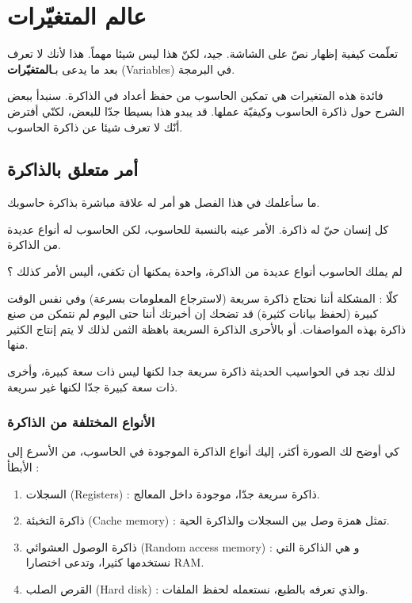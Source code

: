 \chapter{عالم المتغيّرات}

تعلّمت كيفية إظهار نصّ على الشاشة. جيد، لكنّ هذا ليس شيئا مهماً. هذا لأنك لا تعرف بعد ما يدعى بـ\textbf{المتغيّرات}
(\textenglish{Variables})
في البرمجة.

فائدة هذه المتغيرات هي تمكين الحاسوب من حفظ أعداد في الذاكرة. سنبدأ ببعض الشرح حول ذاكرة الحاسوب وكيفيّة عملها. قد يبدو هذا بسيطا جدّا للبعض، لكنّي أفترض أنّك لا تعرف شيئا عن ذاكرة الحاسوب.

\section{أمر متعلق بالذاكرة}
ما سأعلمك في هذا الفصل هو أمر له علاقة مباشرة بذاكرة حاسوبك.

كل إنسان حيّ له ذاكرة. الأمر عينه بالنسبة للحاسوب، لكن الحاسوب له أنواع عديدة من الذاكرة.

\begin{question}
  لم يملك الحاسوب أنواع عديدة من الذاكرة، واحدة يمكنها أن تكفي، أليس الأمر كذلك ؟
\end{question}

كلّا : المشكلة أننا نحتاج ذاكرة سريعة (لاسترجاع المعلومات بسرعة) وفي نفس الوقت كبيرة (لحفظ بيانات كثيرة) قد تضحك إن أخبرتك أننا حتى اليوم لم نتمكن من صنع ذاكرة بهذه المواصفات. أو بالأحرى الذاكرة السريعة باهظة الثمن لذلك لا يتم إنتاج الكثير منها.

لذلك نجد في الحواسيب الحديثة ذاكرة سريعة جدا لكنها ليس ذات سعة كبيرة، وأخرى ذات سعة كبيرة جدّا لكنها غير سريعة.

\subsection{الأنواع المختلفة من الذاكرة}
كي أوضح لك الصورة أكثر، إليك أنواع الذاكرة الموجودة في الحاسوب، من الأسرع إلى الأبطأ :

\begin{enumerate}
  \item السجلات
  (\textenglish{Registers}) :
ذاكرة سريعة جدّا، موجودة داخل المعالج.
  \item ذاكرة التخبئة 
  (\textenglish{Cache memory}) :
تمثل همزة وصل بين السجلات والذاكرة الحية.
  \item ذاكرة الوصول العشوائي 
  (\textenglish{Random access memory}) :
و هي الذاكرة التي نستخدمها كثيرا، وتدعى اختصارا
\textenglish{RAM}.
  \item القرص الصلب
  (\textenglish{Hard disk}) :
والذي تعرفه بالطبع، نستعمله لحفظ الملفات.
\end{enumerate}

